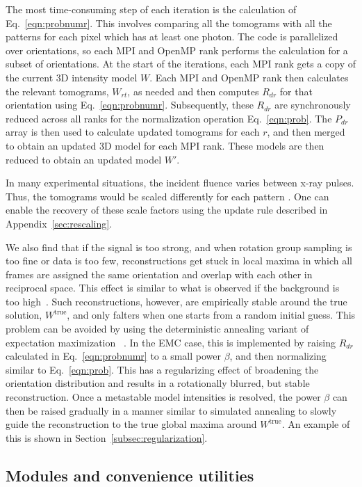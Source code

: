 \documentclass[]{iucr}              %
\begin{document}
The most time-consuming step of each iteration is the calculation of Eq.~\ref{eqn:probnumr}. This involves comparing all the tomograms with all the patterns for each pixel which has at least one photon. The code is parallelized over orientations, so each MPI and OpenMP rank performs the calculation for a subset of orientations. At the start of the iterations, each MPI rank gets a copy of the current 3D intensity model $W$. Each MPI and OpenMP rank then calculates the relevant tomograms, $W_{rt}$, as needed and then computes $R_{dr}$ for that orientation using Eq.~\ref{eqn:probnumr}. Subsequently, these $R_{dr}$ are synchronously reduced across all ranks for the normalization operation Eq.~\ref{eqn:prob}. The $P_{dr}$ array is then used to calculate updated tomograms for each $r$, and then merged to obtain an updated 3D model for each MPI rank. These models are then reduced to obtain an updated model $W'$.

In many experimental situations, the incident fluence varies between x-ray pulses. Thus, the tomograms would be scaled differently for each pattern \cite{loh2010,ekeberg2015}. One can enable the recovery of these scale factors using the update rule described in Appendix~\ref{sec:rescaling}. 

We also find that if the signal is too strong, and when rotation group sampling is too fine or data is too few, reconstructions get stuck in local maxima in which all frames are assigned the same orientation and overlap with each other in reciprocal space. This effect is similar to what is observed if the background is too high~\cite{ayyer2015}. Such reconstructions, however, are empirically stable around the true solution, $W^{\text{true}}$, and only falters when one starts from a random initial guess. This problem can be avoided by using the deterministic annealing variant of expectation maximization ~\cite{ueda1998}. In the EMC case, this is implemented by raising $R_{dr}$ calculated in Eq.~\ref{eqn:probnumr} to a small power $\beta$, and then normalizing similar to Eq.~\ref{eqn:prob}. This has a regularizing effect of broadening the orientation distribution and results in a rotationally blurred, but stable reconstruction. Once a metastable model intensities is resolved, the power $\beta$ can then be raised gradually in a manner similar to simulated annealing to slowly guide the reconstruction to the true global maxima around $W^{\text{true}}$. An example of this is shown in Section~\ref{subsec:regularization}.

\subsection{Modules and convenience utilities}\label{subsec:mod+utils}
\end{document}
